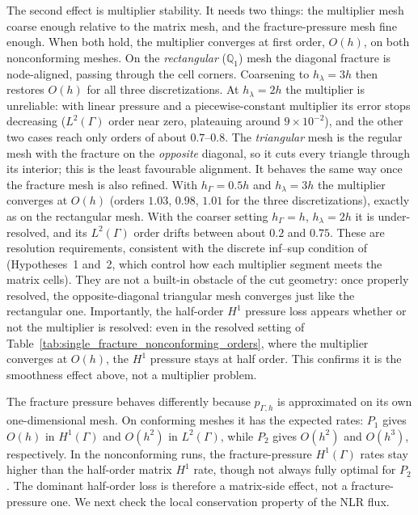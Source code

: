\documentclass[a4paper,fleqn]{cas-sc}
\begin{document}
The second effect is multiplier stability. It needs two things: the multiplier
mesh coarse enough relative to the matrix mesh, and the fracture-pressure mesh
fine enough. When both hold, the multiplier converges at first order, \(O(h)\), on
both nonconforming meshes. On the \emph{rectangular} (\(\mathbb{Q}_1\)) mesh the
diagonal fracture is node-aligned, passing through the cell corners. Coarsening to
\(h_\lambda=3h\) then restores \(O(h)\) for all three discretizations. At
\(h_\lambda=2h\) the multiplier is unreliable: with linear pressure and a
piecewise-constant multiplier its error stops decreasing (\(L^2(\Gamma)\) order
near zero, plateauing around \(9\times10^{-2}\)), and the other two cases reach
only orders of about \(0.7\)--\(0.8\). The \emph{triangular} mesh is the regular
mesh with the fracture on the \emph{opposite} diagonal, so it cuts every triangle
through its interior; this is the least favourable alignment. It behaves the same
way once the fracture mesh is also refined. With \(h_\Gamma=0.5h\) and
\(h_\lambda=3h\) the multiplier converges at \(O(h)\) (orders \(1.03\), \(0.98\),
\(1.01\) for the three discretizations), exactly as on the rectangular mesh. With
the coarser setting \(h_\Gamma=h\), \(h_\lambda=2h\) it is under-resolved, and its
\(L^2(\Gamma)\) order drifts between about \(0.2\) and \(0.75\). These are
resolution requirements, consistent with the discrete inf--sup condition of
\citet{Koeppel2019} (Hypotheses~1 and~2, which control how each multiplier segment
meets the matrix cells). They are not a built-in obstacle of the cut geometry:
once properly resolved, the opposite-diagonal triangular mesh converges just like
the rectangular one. Importantly, the half-order \(H^1\) pressure loss appears whether or not the
multiplier is resolved: even in the resolved setting of
Table~\ref{tab:single_fracture_nonconforming_orders}, where the multiplier
converges at \(O(h)\), the \(H^1\) pressure stays at half order. This confirms it
is the smoothness effect above, not a multiplier problem.

The fracture pressure behaves differently because \(p_{\Gamma,h}\) is
approximated on its own one-dimensional mesh. On conforming meshes it has the
expected rates: \(P_1\) gives \(O(h)\) in \(H^1(\Gamma)\) and \(O(h^2)\) in
\(L^2(\Gamma)\), while \(P_2\) gives \(O(h^2)\) and \(O(h^3)\), respectively. In
the nonconforming runs, the fracture-pressure \(H^1(\Gamma)\) rates stay higher
than the half-order matrix \(H^1\) rate, though not always fully optimal for \(P_2\). The
dominant half-order loss is therefore a matrix-side effect, not a
fracture-pressure one. We next check the local conservation property of the NLR
flux.
\end{document}
